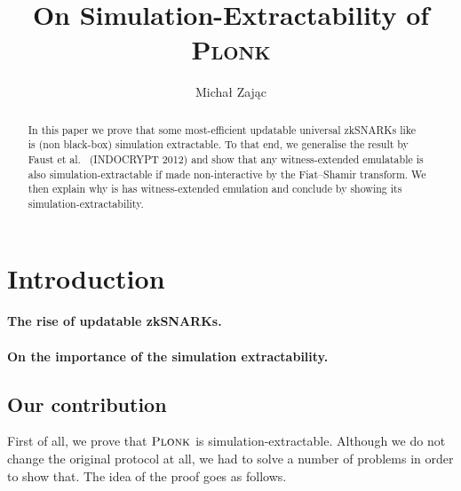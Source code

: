 \documentclass[runningheads,11pt]{llncs}
\title{On Simulation-Extractability of \textsc{Plonk}}
\author{Michał Zając}
\institute{Clearmatics, London, UK\\ \email{m.p.zajac@gmail.com}}
\theoremstyle{definition}
\begin{document}
	\sloppy
	\maketitle

\begin{abstract}
	In this paper we prove that some most-efficient updatable universal zkSNARKs like \plonk{}~\cite{EPRINT:GabWilCio19}  is (non black-box) simulation extractable.
	To that end, we generalise the result by Faust et al.~\cite{INDOCRYPT:FKMV12} (INDOCRYPT 2012) and show that any witness-extended emulatable is also simulation-extractable if made non-interactive by the Fiat--Shamir transform. We then explain why \plonk{} is has witness-extended emulation and conclude by showing its simulation-extractability.
\end{abstract}

\section{Introduction}
\paragraph{The rise of updatable zkSNARKs.}
\cite{C:GKMMM18}
\cite{EC:CHMMVW20}
\cite{CCS:MBKM19}
\cite{EPRINT:GabWilCio19}
\cite{EPRINT:Gabizon19c}
\cite{EPRINT:Lipmaa19a}

\paragraph{On the importance of the simulation extractability.}
\cite{AC:DHLW10}
\cite{AC:Groth07}
\cite{EPRINT:AbdRamSla20}
\cite{EPRINT:KZMQCP15}
\cite{EPRINT:BagAta19}
\cite{EPRINT:Baghery20}



\subsection{Our contribution}
First of all, we prove that $\textsc{Plonk}$ is simulation-extractable. Although we do not change the original protocol at all, we had to solve a number of problems in order to show that. The idea of the proof goes as follows.
\end{document}

